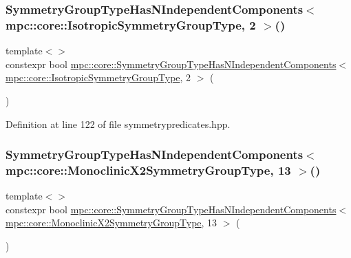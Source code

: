 \subsubsection{\texorpdfstring{Symmetry\+Group\+Type\+Has\+N\+Independent\+Components$<$ mpc\+::core\+::\+Isotropic\+Symmetry\+Group\+Type, 2 $>$()}{SymmetryGroupTypeHasNIndependentComponents< mpc::core::IsotropicSymmetryGroupType, 2 >()}}
{\footnotesize\ttfamily template$<$$>$ \\
constexpr bool \mbox{\hyperlink{namespacempc_1_1core_a4fc1927e7fe7eb577a6bef4ab6bfb4e4}{mpc\+::core\+::\+Symmetry\+Group\+Type\+Has\+N\+Independent\+Components}}$<$ \mbox{\hyperlink{structmpc_1_1core_1_1_isotropic_symmetry_group_type}{mpc\+::core\+::\+Isotropic\+Symmetry\+Group\+Type}}, 2 $>$ (\begin{DoxyParamCaption}{ }\end{DoxyParamCaption})\hspace{0.3cm}{\ttfamily [inline]}}



Definition at line 122 of file symmetrypredicates.\+hpp.

\mbox{\label{namespacempc_1_1core_a7a87a87ba663c97dca99de2c658e78ac}} 
\subsubsection{\texorpdfstring{Symmetry\+Group\+Type\+Has\+N\+Independent\+Components$<$ mpc\+::core\+::\+Monoclinic\+X2\+Symmetry\+Group\+Type, 13 $>$()}{SymmetryGroupTypeHasNIndependentComponents< mpc::core::MonoclinicX2SymmetryGroupType, 13 >()}}
{\footnotesize\ttfamily template$<$$>$ \\
constexpr bool \mbox{\hyperlink{namespacempc_1_1core_a4fc1927e7fe7eb577a6bef4ab6bfb4e4}{mpc\+::core\+::\+Symmetry\+Group\+Type\+Has\+N\+Independent\+Components}}$<$ \mbox{\hyperlink{structmpc_1_1core_1_1_monoclinic_x2_symmetry_group_type}{mpc\+::core\+::\+Monoclinic\+X2\+Symmetry\+Group\+Type}}, 13 $>$ (\begin{DoxyParamCaption}{ }\end{DoxyParamCaption})\hspace{0.3cm}{\ttfamily [inline]}}



